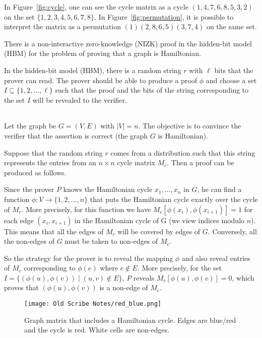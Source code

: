 In Figure~\ref{fig:cycle}, one can see the cycle matrix as a cycle $(1,4,7,6,8,5,3,2)$
on the set $\{1,2,3,4,5,6,7,8\}$. In Figure~\ref{fig:permutation}, it is possible to
interpret the matrix as a permutation $(1)(2,8,6,5)(3,7,4)$ on the same set.

\begin{theorem}
There is a non-interactive zero-knowledge (NIZK) proof in the
hidden-bit model (HBM) for the problem of proving that a graph is Hamiltonian.
\end{theorem}
\proof
In the hidden-bit model (HBM), there is a random string $r$ with $\ell$ bits that the prover
can read. The prover should be able to produce a proof $\phi$ and choose a set
$I\subseteq\{1,2,\ldots,\ell\}$ such that the proof and the bits of the string corresponding to
the set $I$ will be revealed to the verifier.
\begin{table}[ht]
\centering
\begin{tabular}{r c l}
\end{tabular}
\end{table}


Let the graph be $G=(V,E)$ with $|V|=n$.
The objective is to convince the verifier that the assertion is correct (the graph $G$
is Hamiltonian).

Suppose that the random string $r$ comes from a distribution
such that this string represents the entries from an $n\times n$ cycle matrix $M_c$.
Then a proof can be produced as follows.

Since the prover $P$ knows the Hamiltonian cycle $x_1,\ldots,x_n$ in $G$, he can find a
function $\phi:V\rightarrow \{1,2,\ldots,n\}$ that puts the Hamiltonian cycle exactly
over the cycle of $M_c$. More precisely, for this function we have
$M_c[\phi(x_i),\phi(x_{i+1})]=1$ for each edge $(x_i,x_{i+1})$ in the Hamiltonian cycle of G
(we view indices modulo $n$).
This means that all the edges of $M_c$ will be covered by edges of $G$. Conversely, all the
non-edges of $G$ must be taken to non-edges of $M_c$.

So the strategy for the prover is to reveal the mapping $\phi$ and also reveal entries of $M_c$ corresponding to $\phi(e)$ where $e \notin E$. More precisely, for the set
$I=\{(\phi(u),\phi(v)) \mid (u,v)\notin E\}$, $P$ reveals
$M_c[\phi(u),\phi(v)]=0$,
which proves that $(\phi(u),\phi(v))$ is a non-edge of $M_c$.

\begin{figure}[ht]
	\centering
		\texttt{[image: Old Scribe Notes/red\_blue.png]}
	\caption{Graph matrix that includes a Hamiltonian cycle. Edges are blue/red and the
                 cycle is red. White cells are non-edges.}
	\label{fig:red_blue}
\end{figure}

